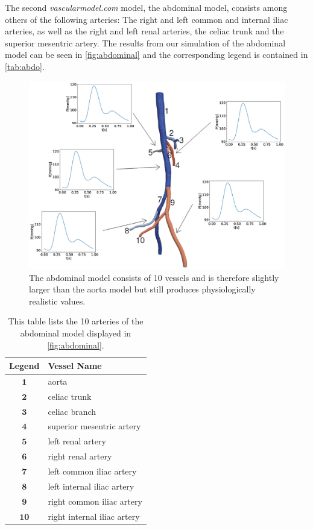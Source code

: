 \documentclass[a4paper, oneside]{discothesis}
\begin{document}
The second \emph{vascularmodel.com} model, the abdominal model, consists among others of the following arteries: 
The right and left common and internal iliac arteries, as well as the right and left renal arteries, the celiac trunk and the superior mesentric artery.
The results from our simulation of the abdominal model can be seen in \autoref{fig:abdominal} and the corresponding legend is contained in \autoref{tab:abdo}.
\begin{figure} [H]
	\centering
	\includegraphics[width=0.8\columnwidth]{figures/0029.eps}
	\caption{The abdominal model consists of 10 vessels and is therefore slightly larger than the aorta model but still produces physiologically realistic values.}
	\label{fig:abdominal}
\end{figure}
\begin{table}[H]
	\begin{center}
		\begin{tabular}{|c|l|}
			\hline
			Legend & Vessel Name\\
			\hline
			$\mathbf{1}$& aorta \\ 
			$\mathbf{2}$& celiac trunk \\
			$\mathbf{3}$& celiac branch \\
			$\mathbf{4}$& superior mesentric artery \\
			$\mathbf{5}$& left renal artery \\
			$\mathbf{6}$& right renal artery \\
			$\mathbf{7}$& left common iliac artery \\
			$\mathbf{8}$& left internal iliac artery \\
			$\mathbf{9}$& right common iliac artery \\
			$\mathbf{10}$& right internal iliac artery \\
			\hline
		\end{tabular}
	\end{center}
	\caption{This table lists the 10 arteries of the abdominal model displayed in \autoref{fig:abdominal}.}
	\label{tab:abdo}
\end{table}
\end{document}
